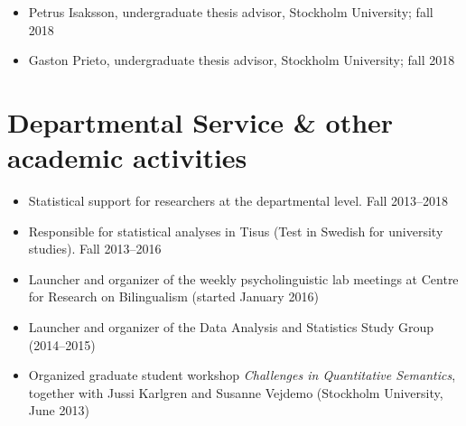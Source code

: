 \documentclass[margin, 11pt]{res} %
\begin{document}
\begin{resume}
\begin{itemize}
\item Petrus Isaksson, undergraduate thesis advisor, Stockholm University; fall 2018

\item Gaston Prieto, undergraduate thesis advisor, Stockholm University; fall 2018

\end{itemize}



\section{\sc Departmental Service \& other academic activities}

\begin{itemize}

\item Statistical support for researchers at the departmental level. 
Fall 2013--2018

\item Responsible for statistical analyses in Tisus (Test in Swedish for university studies). 
Fall 2013--2016


\item Launcher and organizer of the weekly psycholinguistic lab meetings at Centre for Research on Bilingualism (started January 2016)

\item Launcher and organizer of the Data Analysis and Statistics Study Group (2014--2015)

\item Organized graduate student workshop \emph{Challenges in Quantitative Semantics}, together with Jussi Karlgren and Susanne Vejdemo (Stockholm University, June 2013)

\end{itemize}




\end{resume}
\end{document}
